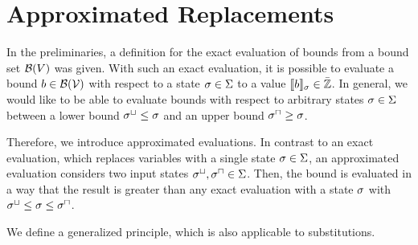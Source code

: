 \section{Approximated Replacements}

In the preliminaries, a definition for the exact evaluation of bounds from a bound set $\mathcal{B}(V)$ was given.
With such an exact evaluation, it is possible to evaluate a bound $b \in \mathcal{B}(\mathcal{V})$ with respect to a state $\sigma \in \Sigma$ to a value $\llbracket b \rrbracket_{\sigma} \in \bar{\mathbb{Z}}$.
In general, we would like to be able to evaluate bounds with respect to arbitrary states $\sigma \in \Sigma$ between a lower bound ${\sigma^\sqcup} \leq \sigma$ and an upper bound ${\sigma^\sqcap} \geq \sigma$.

Therefore, we introduce approximated evaluations.
In contrast to an exact evaluation, which replaces variables with a single state $\sigma \in \Sigma$, an approximated evaluation considers two input states ${\sigma^\sqcup}, {\sigma^\sqcap} \in \Sigma$.
Then, the bound is evaluated in a way that the result is greater than any exact evaluation with a state $\sigma$ with ${\sigma^\sqcup} \leq \sigma \leq {\sigma^\sqcap}$.

We define a generalized principle, which is also applicable to substitutions.

